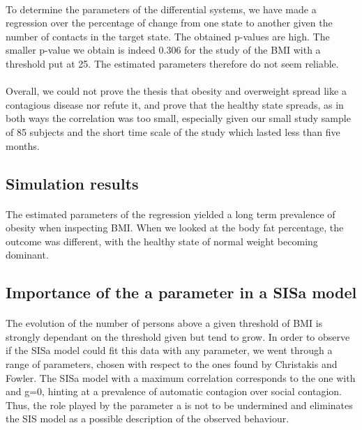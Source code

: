 \documentclass[11pt]{article}
\begin{document}
\paragraph{}
To determine the parameters of the differential systems, we have made a regression over the percentage of change from one state to another given the number of contacts in the target state. The obtained p-values are high. The smaller p-value we obtain is indeed 0.306 for the study of the BMI with a threshold put at 25. The estimated parameters therefore do not seem reliable. 

\paragraph{}

Overall, we could not prove the thesis that obesity and overweight spread like a contagious disease nor refute it, and prove that the healthy state spreads, as in both ways the correlation was too small, especially given our small study sample of 85 subjects and the short time scale of the study which lasted less than five months.

\subsection{Simulation results}
\paragraph{}
The estimated parameters of the regression yielded a long term prevalence of obesity when inspecting BMI. When we looked at the body fat percentage, the outcome was different, with the healthy state of normal weight becoming dominant.

\subsection{Importance of the a parameter in a SISa model}

\paragraph{}
The evolution of the number of persons above a given threshold of BMI is strongly dependant on the threshold given but tend to grow. In order to observe if the SISa model could fit this data with any parameter, we went through a range of parameters, chosen with respect to the ones found by Christakis and Fowler. The SISa model with a maximum correlation corresponds to the one with \beta{} and g=0, hinting at a prevalence of automatic contagion over social contagion. Thus, the role played by the parameter a is not to be undermined and eliminates the SIS model as a possible description of the observed behaviour.
\end{document}
